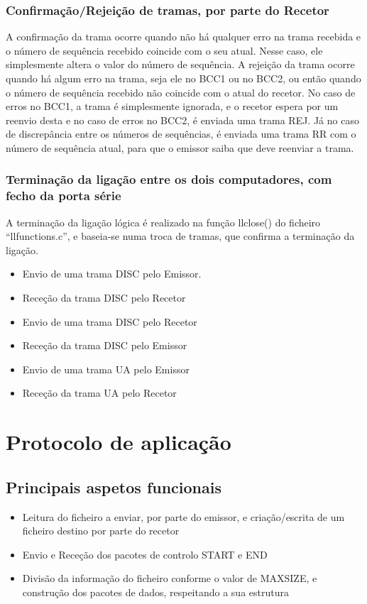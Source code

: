 \documentclass[article, a4paper, 11pt, oneside]{memoir}
\begin{document}
\subsection{Confirmação/Rejeição de tramas, por parte do Recetor}
A confirmação da trama ocorre quando não há qualquer erro na trama recebida e o número de sequência recebido coincide com o seu atual. 
Nesse caso, ele simplesmente altera o valor do número de sequência.
A rejeição da trama ocorre quando há algum erro na trama, seja ele no BCC1 ou no BCC2, ou então quando o número de sequência recebido não coincide com o atual do recetor.
 No caso de erros no BCC1, a trama é simplesmente ignorada, e o recetor espera por um reenvio desta e no caso de erros no BCC2, é enviada uma trama REJ. 
 Já no caso de discrepância entre os números de sequências, é enviada uma trama RR com o número de sequência atual, para que o emissor saiba que deve reenviar a trama.
 
 \subsection{Terminação da ligação entre os dois computadores, com fecho da porta série}
A terminação da ligação lógica é realizado na função llclose() do ficheiro “llfunctions.c”, e baseia-se numa troca de tramas, que confirma a terminação da ligação. 
\begin{itemize}
	\item Envio de uma trama DISC pelo Emissor.
	\item Receção da trama DISC pelo Recetor
	\item Envio de uma trama DISC pelo Recetor
	\item Receção da trama DISC pelo Emissor
	\item Envio de uma trama UA pelo Emissor
	\item Receção da trama UA pelo Recetor
\end{itemize}


\chapter[Protocolo de aplicação][Protocolo de aplicação]{Protocolo de aplicação} \label{\thechapter}
  
\section{Principais aspetos funcionais}
\begin{itemize}
  \item Leitura do ficheiro a enviar, por parte do emissor, e criação/escrita de um ficheiro destino por parte do recetor
  \item Envio e Receção dos pacotes de controlo START e END
  \item Divisão da informação do ficheiro conforme o valor de MAX\textunderscore SIZE, e construção dos pacotes de dados, respeitando a sua estrutura
\end{itemize}
\end{document}
